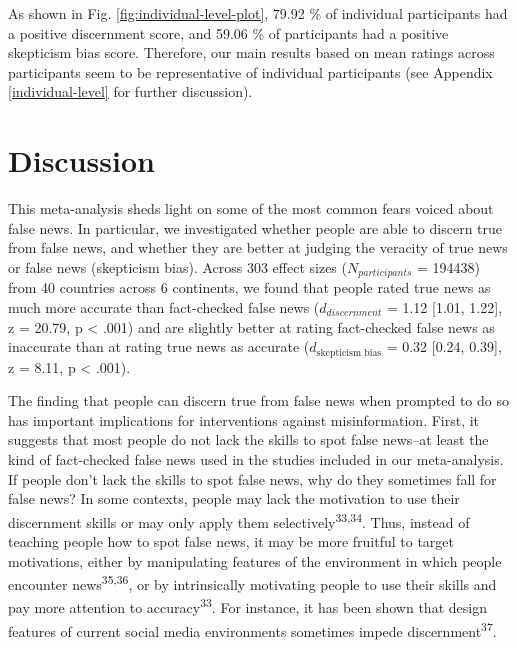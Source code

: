 \documentclass[
  doc,floatsintext]{apa6}
\begin{document}
As shown in Fig. \ref{fig:individual-level-plot}, 79.92 \% of individual participants had a positive discernment score, and 59.06 \% of participants had a positive skepticism bias score. Therefore, our main results based on mean ratings across participants seem to be representative of individual participants (see Appendix \ref{individual-level} for further discussion).

\section{Discussion}\label{discussion}

This meta-analysis sheds light on some of the most common fears voiced about false news. In particular, we investigated whether people are able to discern true from false news, and whether they are better at judging the veracity of true news or false news (skepticism bias). Across 303 effect sizes (\(N_{participants}\) = 194438) from 40 countries across 6 continents, we found that people rated true news as much more accurate than fact-checked false news (\(d_{discernment}\) = 1.12 {[}1.01, 1.22{]}, z = 20.79, p \textless{} .001) and are slightly better at rating fact-checked false news as inaccurate than at rating true news as accurate (\(d_{\text{skepticism bias}}\) = 0.32 {[}0.24, 0.39{]}, z = 8.11, p \textless{} .001).

The finding that people can discern true from false news when prompted to do so has important implications for interventions against misinformation. First, it suggests that most people do not lack the skills to spot false news--at least the kind of fact-checked false news used in the studies included in our meta-analysis. If people don't lack the skills to spot false news, why do they sometimes fall for false news? In some contexts, people may lack the motivation to use their discernment skills or may only apply them selectively\textsuperscript{33,34}. Thus, instead of teaching people how to spot false news, it may be more fruitful to target motivations, either by manipulating features of the environment in which people encounter news\textsuperscript{35,36}, or by intrinsically motivating people to use their skills and pay more attention to accuracy\textsuperscript{33}. For instance, it has been shown that design features of current social media environments sometimes impede discernment\textsuperscript{37}.
\end{document}
